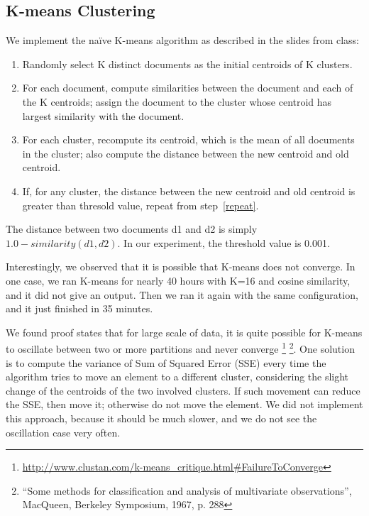 \documentclass{article}
\begin{document}
\subsection{K-means Clustering}
We implement the na\"ive K-means algorithm as described in the slides from
class:
\begin{enumerate}
  \item Randomly select K distinct documents as the initial centroids of K
  clusters.
  \item \label{repeat} For each document, compute similarities between the
  document and each of the K centroids; assign the document to the cluster whose
  centroid has largest similarity with the document.
  \item For each cluster, recompute its centroid, which is the mean of all
  documents in the cluster; also compute the distance between the new centroid
  and old centroid.
  \item If, for any cluster, the distance between the new centroid and old
  centroid is greater than thresold value, repeat from step~\ref{repeat}. 
\end{enumerate}

\noindent The distance between two documents d1 and d2 is simply $1.0 -
similarity(d1, d2)$. In our experiment, the threshold value is 0.001.

Interestingly, we observed that it is possible that K-means does not converge.
In one case, we ran K-means for nearly 40 hours with K=16 and cosine similarity,
and it did not give an output. Then we ran it again with the same configuration,
and it just finished in 35 minutes.

We found proof states that for large scale of data, it is quite possible for
K-means to oscillate between two or more partitions and never converge
\footnote{\url{http://www.clustan.com/k-means_critique.html\#FailureToConverge}}
\footnote{``Some methods for classification and analysis of multivariate
observations'', MacQueen, Berkeley Symposium, 1967, p. 288}. One solution is to
compute the variance of Sum of Squared Error (SSE) every time the algorithm
tries to move an element to a different cluster, considering the slight change
of the centroids of the two involved clusters. If such movement can reduce the
SSE, then move it; otherwise do not move the element. We did not implement this
approach, because it should be much slower, and we do not see the oscillation
case very often.
\end{document}
